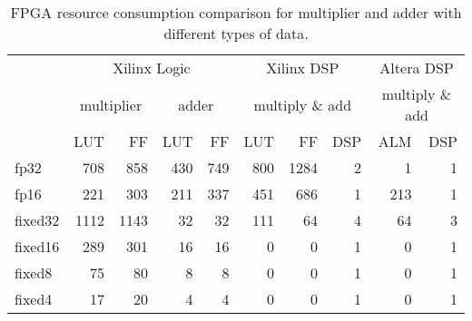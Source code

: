 \begin{table}[htbp]
    \centering
    \caption{FPGA resource consumption comparison for multiplier and adder with different types of data.}
      \begin{tabular}{l|rr|rr|rrr|rr} \toprule
      \multirow{2}[4]{*}{} & \multicolumn{4}{c|}{Xilinx Logic} & \multicolumn{3}{c|}{Xilinx DSP} & \multicolumn{2}{c}{Altera DSP} \\ \cline{2-10}         
       & \multicolumn{2}{c|}{multiplier} & \multicolumn{2}{c|}{adder} & \multicolumn{3}{c|}{multiply \& add} & \multicolumn{2}{c}{multiply \& add} \\ \cline{2-10}
              & LUT   & FF    & LUT   & FF    & LUT   & FF    & DSP   & ALM   & DSP \\ \hline
      fp32    & 708   & 858   & 430   & 749   & 800   & 1284  & 2     & 1     & 1 \\ %
      fp16    & 221   & 303   & 211   & 337   & 451   & 686   & 1     & 213   & 1 \\ %
      fixed32 & 1112  & 1143  & 32    & 32    & 111   & 64    & 4     & 64    & 3 \\ %
      fixed16 & 289   & 301   & 16    & 16    & 0     & 0     & 1     & 0     & 1 \\ %
      fixed8  & 75    & 80    & 8     & 8     & 0     & 0     & 1     & 0     & 1 \\ %
      fixed4  & 17    & 20    & 4     & 4     & 0     & 0     & 1     & 0     & 1 \\ %
      \bottomrule
      \end{tabular}
    \label{tab:mac}
\end{table}
  